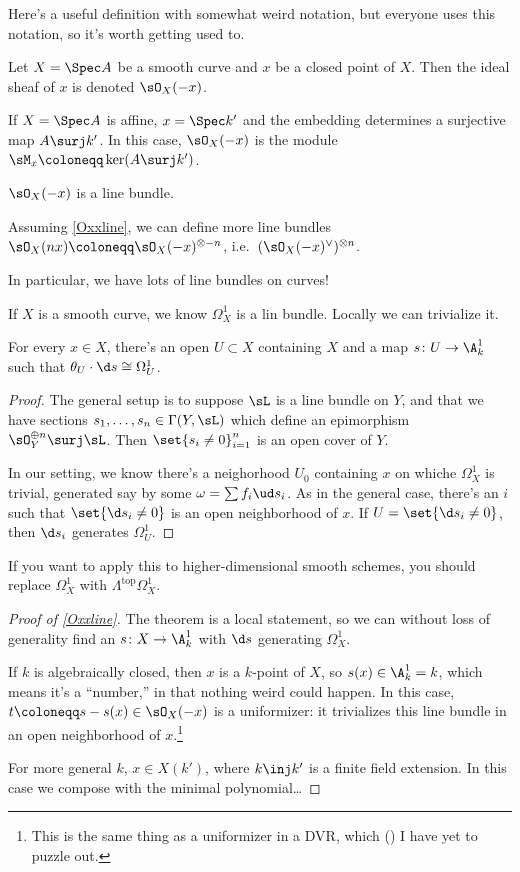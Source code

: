 Here's a useful definition with somewhat weird notation, but everyone uses this notation, so it's worth getting
used to.
\begin{defn}
Let $X = \Spec A$ be a smooth curve and $x$ be a closed point of $X$. Then the ideal sheaf of $x$ is denoted
$\sO_X(-x)$.
\end{defn}
If $X = \Spec A$ is affine, $x = \Spec k'$ and the embedding determines a surjective map $A\surj k'$. In this case,
$\sO_X(-x)$ is the module $\sM_x\coloneqq\ker(A\surj k')$.
\begin{thm}
\label{Oxxline}
$\sO_X(-x)$ is a line bundle.
\end{thm}
\begin{rem}
Assuming \cref{Oxxline}, we can define more line bundles $\sO_X(nx)\coloneqq\sO_X(-x)^{\otimes -n}$, i.e.\
$(\sO_X(-x)^\vee)^{\otimes n}$.
\end{rem}
In particular, we have lots of line bundles on curves!

If $X$ is a smooth curve, we know $\Omega_X^1$ is a lin bundle. Locally we can trivialize it.
\begin{lem}
For every $x\in X$, there's an open $U\subset X$ containing $X$ and a map $s\colon U\to\A_k^1$ such that
$\theta_U\cdot\d s \cong \Omega_U^1$.
\end{lem}
\begin{proof}
The general setup is to suppose $\sL$ is a line bundle on $Y$, and that we have sections
$s_1,\dotsc,s_n\in\Gamma(Y,\sL)$ which define an epimorphism $\sO_Y^{\oplus n}\surj \sL$. Then $\set{s_i\ne
0}_{i=1}^n$ is an open cover of $Y$.

In our setting, we know there's a neighorhood $U_0$ containing $x$ on whiche $\Omega_X^1$ is trivial, generated say
by some $\omega = \sum f_i\ud s_i$. As in the general case, there's an $i$ such that $\set{\d s_i\ne 0}$ is an open
neighborhood of $x$. If $U = \set{\d s_i\ne 0}$, then $\d s_i$ generates $\Omega_U^1$.
\end{proof}
\begin{rem}
If you want to apply this to higher-dimensional smooth schemes, you should replace $\Omega_X^1$ with
$\Lambda^{\mathrm{top}}\Omega_X^1$.
\end{rem}
\begin{proof}[Proof of \cref{Oxxline}]
The theorem is a local statement, so we can without loss of generality find an $s\colon X\to\A_k^1$ with $\d s$
generating $\Omega_X^1$.

If $k$ is algebraically closed, then $x$ is a $k$-point of $X$, so $s(x)\in\A_k^1 = k$, which means it's a
``number,'' in that nothing weird could happen. In this case, $t\coloneqq s - s(x)\in\sO_X(-x)$ is a uniformizer:
it trivializes this line bundle in an open neighborhood of $x$.\footnote{This is the same thing as a uniformizer in
a DVR, which (\TODO) I have yet to puzzle out.}

For more general $k$, $x\in X(k')$, where $k\inj k'$ is a finite field extension. In this case we compose with the
minimal polynomial\dots
\end{proof}
